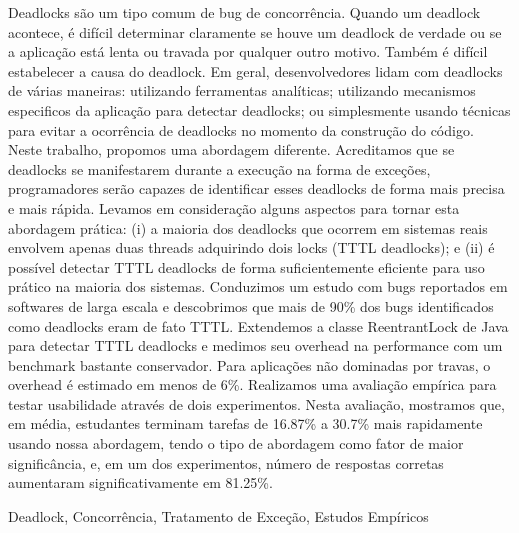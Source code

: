 Deadlocks são um tipo comum de bug de concorrência. Quando um deadlock acontece, é difícil determinar claramente se houve um deadlock de verdade ou se a aplicação está lenta ou travada por qualquer outro motivo. Também é difícil estabelecer a causa do deadlock. Em geral, desenvolvedores lidam com deadlocks de várias maneiras: utilizando ferramentas analíticas; utilizando mecanismos especificos da aplicação para detectar deadlocks; ou simplesmente usando técnicas para evitar a ocorrência de deadlocks no momento da construção do código. Neste trabalho, propomos uma abordagem diferente. Acreditamos que se deadlocks se manifestarem durante a execução na forma de exceções, programadores serão capazes de identificar esses deadlocks de forma mais precisa e mais rápida. Levamos em consideração alguns aspectos para tornar esta abordagem prática: (i) a maioria dos deadlocks que ocorrem em sistemas reais envolvem apenas duas threads adquirindo dois locks (TTTL deadlocks); e (ii) é possível detectar TTTL deadlocks de forma suficientemente eficiente para uso prático na maioria dos sistemas. Conduzimos um estudo com bugs reportados em softwares de larga escala e descobrimos que mais de 90\% dos bugs identificados como deadlocks eram de fato TTTL. Extendemos a classe ReentrantLock de Java para detectar TTTL deadlocks e medimos seu overhead na performance com um benchmark bastante conservador. Para aplicações não dominadas por travas, o overhead é estimado em menos de 6\%. Realizamos uma avaliação empírica para testar usabilidade através de dois experimentos. Nesta avaliação, mostramos que, em média, estudantes terminam tarefas de 16.87\% a 30.7\% mais rapidamente usando nossa abordagem, tendo o tipo de abordagem como fator de maior significância, e, em um dos experimentos, número de respostas corretas aumentaram significativamente em 81.25\%.

\begin{keywords}
Deadlock, Concorrência, Tratamento de Exceção, Estudos Empíricos
\end{keywords}